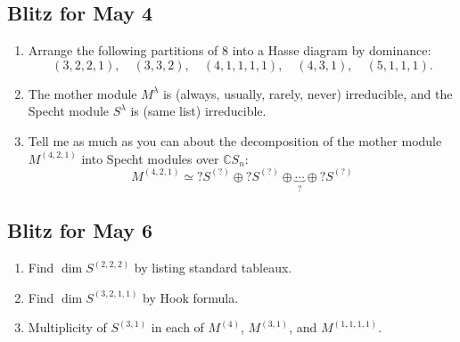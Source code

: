 \documentclass[12pt]{article}
\newcommand{\cx}{\mathbb{C}}
\theoremstyle{definition}
\begin{document}
\subsection{Blitz for May 4}
\begin{enumerate}
    \item Arrange the following partitions of 8 into a Hasse diagram by dominance:
    \begin{equation*}
        (3,2,2,1) , \quad (3,3,2), \quad (4,1,1,1,1), \quad (4,3,1), \quad (5,1,1,1).
    \end{equation*}
    \item The mother module $M^{\lambda}$ is (always, usually, rarely, never) irreducible, and the Specht module $S^{\lambda}$ is (same list) irreducible.
    \item Tell me as much as you can about the decomposition of the mother module $M^{(4,2,1)}$ into Specht modules over $\cx S_n$:
    \begin{equation*}
        M^{(4,2,1)} \simeq ? S^{(?)} \oplus ? S^{(?)} \oplus \underbrace{ \dotsb }_{?} \oplus ? S^{(?)}
    \end{equation*}
\end{enumerate}
\subsection{Blitz for May 6}
\begin{enumerate}
    \item Find $\dim S^{(2,2,2)}$ by listing standard tableaux.
    \item Find  $\dim S^{(3,2,1,1)}$ by Hook formula.
    \item Multiplicity of $S^{(3,1)}$ in each of $M^{(4)}$, $M^{(3,1)}$, and $M^{(1,1,1,1)}$.
\end{enumerate}
\end{document}
